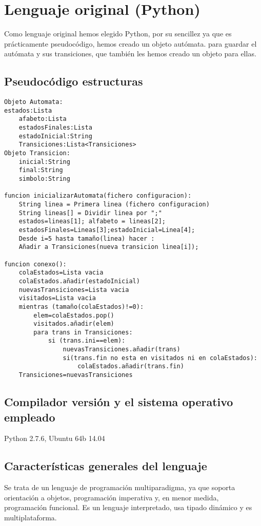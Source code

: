 \documentclass[12pt,a4paper]{article}
\begin{document}
\section{Lenguaje original (Python)}

Como lenguaje original hemos elegido Python, por su sencillez ya que es
prácticamente pseudocódigo, hemos creado un objeto autómata. para guardar el
autómata y sus transiciones, que también les hemos creado un objeto para ellas.


\subsection{Pseudocódigo estructuras}

\begin{lstlisting}
Objeto Automata:
estados:Lista
	afabeto:Lista
	estadosFinales:Lista
	estadoInicial:String
	Transiciones:Lista<Transiciones>
Objeto Transicion: 
	inicial:String
	final:String
	simbolo:String

funcion inicializarAutomata(fichero configuracion):
	String linea = Primera linea (fichero configuracion)
	String lineas[] = Dividir linea por ";"
	estados=lineas[1]; alfabeto = lineas[2];
	estadosFinales=Lineas[3];estadoInicial=Linea[4];
	Desde i=5 hasta tamaño(linea) hacer :
	Añadir a Transiciones(nueva transicion linea[i]);

funcion conexo():
	colaEstados=Lista vacia
	colaEstados.añadir(estadoInicial)
	nuevasTransiciones=Lista vacia
	visitados=Lista vacia
	mientras (tamaño(colaEstados)!=0):
		elem=colaEstados.pop()
		visitados.añadir(elem)
		para trans in Transiciones:
			si (trans.ini==elem):
				nuevasTransiciones.añadir(trans)
				si(trans.fin no esta en	visitados ni en colaEstados):
					colaEstados.añadir(trans.fin)
	Transiciones=nuevasTransiciones
\end{lstlisting}

\subsection{Compilador versión y el sistema operativo empleado}
Python 2.7.6, Ubuntu 64b 14.04


\subsection{Características generales del lenguaje}
  Se trata de un lenguaje de programación multiparadigma, ya que soporta orientación a objetos, programación imperativa y, en menor medida, programación funcional. Es un lenguaje interpretado, usa tipado dinámico y es multiplataforma.
\end{document}
